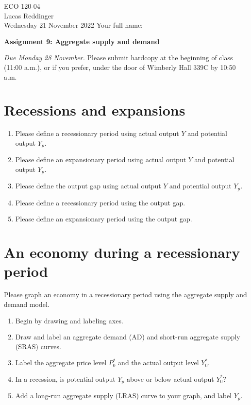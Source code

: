 \documentclass[
    letterpaper,paper=portrait,fleqn,
    DIV=16,fontsize=12pt,twoside=semi,
    parskip=full-,
    headings=standardclasses]
{scrartcl}
\begin{document}
\RaggedRight
\thispagestyle{plain}

ECO 120-04 \\
Lucas Reddinger \\
Wednesday 21 November 2022 \hfill Your full name: \underline{\hspace{3.25in}}

\vspace{0.7\baselineskip}
\textbf{\LARGE Assignment 9: Aggregate supply and demand}
\vspace{0.3\baselineskip}

\emph{Due Monday 28 November.} Please submit hardcopy at the beginning of class (11:00 a.m.), or if you prefer, under the door of Wimberly Hall 339C by 10:50 a.m.

\section{Recessions and expansions}

\begin{enumerate}
\item Please define a recessionary period using actual output $Y$ and potential output $Y_p$.
\vfill
\item Please define an expansionary period using actual output $Y$ and potential output $Y_p$.
\vfill
\item Please define the output gap using actual output $Y$ and potential output $Y_p$.
\vfill
\item Please define a recessionary period using the output gap.
\vfill
\item Please define an expansionary period using the output gap.
\vfill
\end{enumerate}

\vspace{-2\baselineskip}
\clearpage

\section{An economy during a recessionary period\label{sec:recession}}

Please graph an economy in a recessionary period using the aggregate supply and demand model.

\begin{enumerate}
\item Begin by drawing and labeling axes.
\item Draw and label an aggregate demand (AD) and short-run aggregate supply (SRAS) curves.
\item Label the aggregate price level $P^*_0$ and the actual output level $Y^*_0$.
\item In a recession, is potential output $Y_p$ above or below actual output $Y^*_0$? \hfill \underline{\hspace{1.5in}}
\item Add a long-run aggregate supply (LRAS) curve to your graph, and label $Y_p$.
\end{enumerate}
\end{document}
